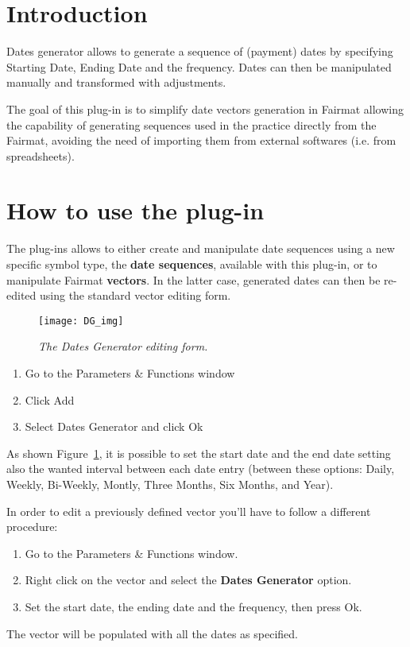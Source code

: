 \newcommand{\pluginName}{Dates Generator}
\newcommand{\pluginVersion}{1.0}





\PluginTitle{\pluginName}{\pluginVersion}

\section{Introduction}
Dates generator allows to generate a sequence of (payment) dates by specifying Starting Date, Ending Date and the frequency. Dates can then be manipulated manually and transformed with adjustments.

The goal of this plug-in is to simplify date vectors generation in Fairmat allowing the capability of generating sequences used in the practice directly from the Fairmat, avoiding the 
need of importing them from external softwares (i.e. from spreadsheets).

\section{How to use the plug-in}
The plug-ins allows to either create and manipulate date sequences using a new specific symbol type, the \textbf{date sequences}, available with this plug-in, or to manipulate Fairmat \textbf{vectors}. In the latter case, generated dates can then be re-edited using the standard vector editing form.

\begin{figure}[htbp]
\texttt{[image: DG\_img]}
\centering
\caption{\small{\emph{The Dates Generator editing form.}}}
\label{fig:DG}
\end{figure}

\begin{enumerate}
\item Go to the Parameters \& Functions window
\item Click Add
\item Select Dates Generator and click Ok
\end{enumerate}
As shown Figure~\ref{fig:DG}, it is possible to set the start date and the end date setting also the wanted interval between each date entry (between these options: Daily, Weekly, Bi-Weekly, Montly, Three Months, Six Months, and Year).




In order to edit a previously defined  vector  you'll have to follow a different procedure:
\begin{enumerate}
\item Go to the Parameters \& Functions window.
\item Right click on the vector and select the \textbf{Dates Generator} option.
\item Set the start date, the ending date and the frequency, then press Ok.
\end{enumerate}
The vector will be populated with all the dates as specified.

